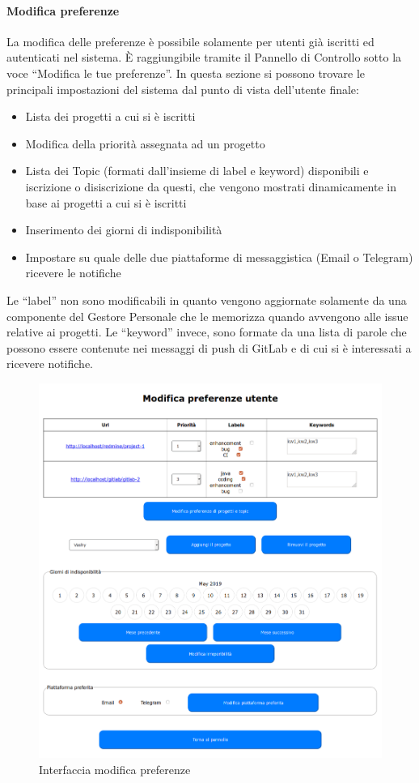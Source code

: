 \paragraph{Modifica preferenze}\label{preferenze}
La modifica delle preferenze è possibile solamente per utenti già iscritti ed autenticati nel sistema.
È raggiungibile tramite il Pannello di Controllo sotto la voce ``Modifica le tue preferenze''.
In questa sezione si possono trovare le principali impostazioni del sistema dal punto di vista dell'utente finale:
\begin{itemize}
	\item Lista dei progetti a cui si è iscritti
	\item Modifica della priorità assegnata ad un progetto
	\item Lista dei Topic (formati dall'insieme di label e keyword) disponibili e iscrizione o disiscrizione da questi, che vengono mostrati dinamicamente in base ai progetti a cui si è iscritti
	\item Inserimento dei giorni di indisponibilità
	\item Impostare su quale delle due piattaforme di messaggistica (Email o Telegram) ricevere le notifiche
\end{itemize}
Le ``label'' non sono modificabili in quanto vengono aggiornate solamente da una componente del Gestore Personale che le memorizza quando avvengono  alle issue relative ai progetti.
Le ``keyword'' invece, sono formate da una lista di parole che possono essere contenute nei messaggi di push di GitLab e di cui si è interessati a ricevere notifiche.
\begin{figure}[H]
	\centering
	\includegraphics[width=16cm]{img/preferenze_1.png}
	\caption{Interfaccia modifica preferenze}
\end{figure}

